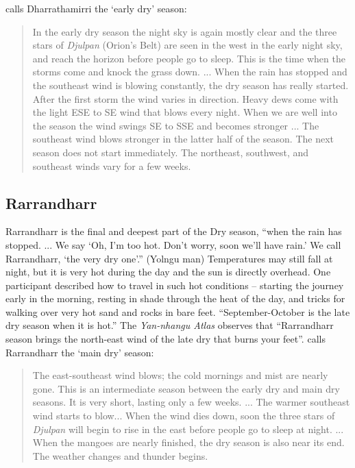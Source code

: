 \citet{davis1989} calls Dharrathamirri the `early dry' season:
\begin{quote}
    In the early dry season the night sky is again mostly clear and the three stars of
    \textit{Djulpan} (Orion's Belt) are seen in the west in the early night sky,
    and reach the horizon before people go to sleep.
    This is the time when the storms come and knock the grass down.
    ...
    When the rain has stopped and the southeast wind is blowing constantly,
    the dry season has really started.
    After the first storm the wind varies in direction.
    Heavy dews come with the light ESE to SE wind that blows every night.
    When we are well into the season the wind swings SE to SSE and becomes stronger
    ...
    The southeast wind blows stronger in the latter half of the season.
    The next season does not start immediately.
    The northeast, southwest, and southeast winds vary for a few weeks.
\end{quote}


\subsection{Rarrandharr}
Rarrandharr is the final and deepest part of the Dry season,
``when the rain has stopped.  ... We say `Oh, I'm too hot.  Don't worry,
soon we'll have rain.'  We call Rarrandharr, `the very dry one'.'' (Yolngu man)
Temperatures may still fall at night, but it is very hot during the day
and the sun is directly overhead.
%
One participant described how to travel in such hot conditions -- starting
the journey early in the morning, resting in shade through the heat of the
day, and tricks for walking over very hot sand and rocks in bare feet.
%
``September-October is the late dry season when it is hot.'' \citep{barber2005}
The \textit{Yan-nhangu Atlas} observes that ``Rarrandharr season brings
the north-east wind of the late dry that burns your feet''.
\citet{davis1989} calls Rarrandharr the `main dry' season:
\begin{quote}
    The east-southeast wind blows; the cold mornings and mist are nearly gone.
    This is an intermediate season between the early dry and main dry seasons.
    It is very short, lasting only a few weeks.
    ...
    The warmer southeast wind starts to blow...
    When the wind dies down, soon the three stars of \textit{Djulpan}
    will begin to rise in the east before people go to sleep at night.
    ...
    When the mangoes are nearly finished, the dry season is also near its end.
    The weather changes and thunder begins.
\end{quote}




